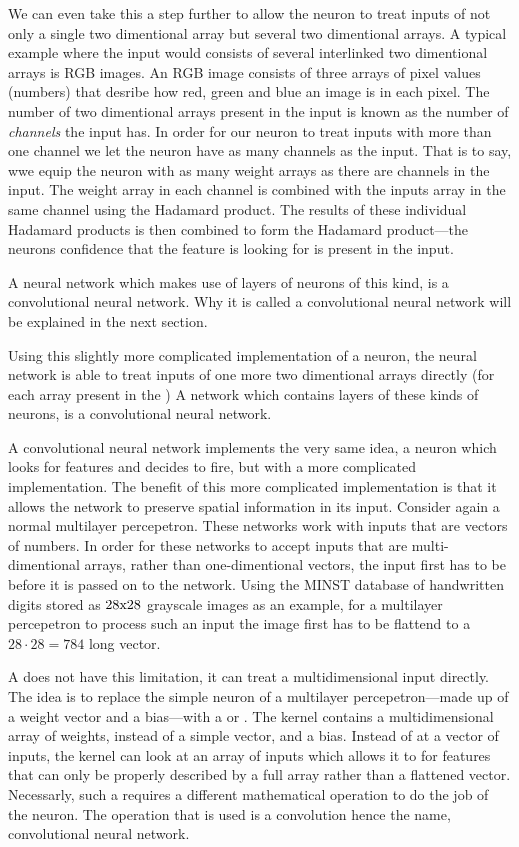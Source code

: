 We can even take this a step further to allow the neuron to treat inputs of not only a single two dimentional array but several two dimentional arrays.
A typical example where the input would consists of several interlinked two dimentional arrays is RGB images.
An RGB image consists of three arrays of pixel values (numbers) that desribe how red, green and blue an image is in each pixel.
The number of two dimentional arrays present in the input is known as the number of {\em channels} the input has.
In order for our neuron to treat inputs with more than one channel we let the neuron have as many channels as the input.
That is to say, wwe equip the neuron with as many weight arrays as there are channels in the input.
The weight array in each channel is combined with the inputs array in the same channel using the Hadamard product.
The results of these individual Hadamard products is then combined to form the  Hadamard product---the neurons  confidence that the feature is looking for is present in the input.

A neural network which makes use of layers of neurons of this kind, is a convolutional neural network.
Why it is called a convolutional neural network will be explained in the next section.


Using this slightly more complicated implementation of a neuron, the neural network is able to treat inputs of one more two dimentional arrays directly (for each array present in the )
A network which contains layers of these kinds of neurons, is a convolutional neural network.


A convolutional neural network implements the very same idea, a neuron which looks for features and decides to fire, but with a more complicated implementation.
The benefit of this more complicated implementation is that it allows the network to preserve spatial information in its input.
Consider again a normal multilayer percepetron.
These networks work with inputs that are vectors of numbers.
In order for these networks to accept inputs that are multi-dimentional arrays, rather than one-dimentional vectors, the input first has to be  before it is passed on to the network.
Using the MINST database of handwritten digits stored as $28{\rm x}28$ grayscale images as an example, for a multilayer percepetron to process such an input the image first has to be flattend to a $28 \cdot 28=784$ long vector.

A  does not have this limitation, it can treat a multidimensional input directly.
The idea is to replace the simple neuron of a multilayer percepetron---made up of a weight vector and a bias---with a  or .
The kernel contains a multidimensional array of weights, instead of a simple vector, and a bias.
Instead of  at a vector of inputs, the kernel can look at an array of inputs which allows it to  for features that can only be properly described by a full array rather than a flattened vector.
Necessarly, such a  requires a different mathematical operation to do the  job of the neuron.
The operation that is used is a convolution hence the name, convolutional neural network.

